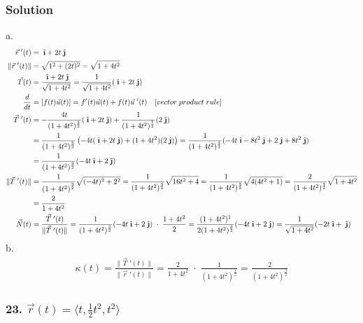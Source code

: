 \documentclass{article}
\newcommand{\ihat}{\;\hat{\textbf{\i}}}
\newcommand{\jhat}{\;\hat{\textbf{\j}}}
\newcommand{\drvec}{\vec{r}\;'(t)}
\begin{document}
\subsubsection*{Solution}
a. 
\begin{align*}
    \drvec &=  \ihat +  2t\jhat \\ 
    \|\drvec\| &= \sqrt{1^2 + (2t)^2} = \sqrt{1 + 4t^2}  \\
    \vec T (t) &=  \frac{\ihat + 2t\jhat}{\sqrt{1 + 4t^2}} = \frac{1}{\sqrt{1 + 4t^2}}(\ihat + 2t\jhat) \\
    \frac{d}{dt} &= [f(t)\vec u (t)] = f'(t)\vec u (t) + f(t)\vec u \;'(t) \quad [vector\;product\;rule] \\  
    \vec T \;'(t) &= -\frac{4t}{(1+4t^2)^{\frac 3 2}}(\ihat + 2t\jhat) + \frac{1}{(1 + 4t^2)^{\frac 1 2}}(2\jhat) \\
                  &= \frac{1}{(1 + 4t^2)^{\frac 3 2}}\left(-4t(\ihat + 2t\jhat) + (1+4t^2)(2\jhat)\right) = \frac{1}{(1 + 4t^2)^{\frac 3 2}}(-4t\ihat - 8t^2\jhat + 2\jhat + 8t^2\jhat) \\
                  &= \frac{1}{(1 + 4t^2)^{\frac 3 2}}(-4t\ihat + 2\jhat) \\
    \| \vec T \;'(t)\| &= \frac{1}{\left(1+4t^2\right)^{\frac 3 2}}\sqrt{(-4t)^2 + 2^2} = \frac{1}{(1 + 4t^2)^{\frac 3 2}} \sqrt{16t^2 + 4} = \frac{1}{(1 + 4t^2)^{\frac 3 2}}\sqrt{4(4t^2 + 1)} = \frac{2}{(1 + 4t^2)^{\frac 3 2}}\sqrt{1+4t^2} \\
                       &= \frac{2}{1+4t^2} \\
    \vec N (t) &=  \frac{\vec T\;'(t)}{\|\vec T\;'(t)\|} = \frac{1}{(1+4t^2)^{\frac 3 2}}(-4t\ihat + 2\jhat) \; \cdot \; \frac{1+4t^2}{2} = \frac{(1+4t^2)^1}{2(1+4t^2)^{\frac 3 2}}(-4t\ihat + 2\jhat) = \frac{1}{\sqrt{1+4t^2}}(-2t\ihat + \jhat)
\end{align*}
b.
\begin{align*}
    \kappa (t) = \frac{\|\vec T\;'(t)\|}{\|\drvec\|} = \frac{2}{1+4t^2} \;\cdot\; \frac{1}{(1+4t^2)^\frac 1 2} = \frac{2}{(1+4t^2)^{\frac 3 2}}
\end{align*}
\subsubsection*{23. $\vec{r}(t) = \langle{t, \frac{1}{2}t^2, t^2} \rangle$}
\end{document}
